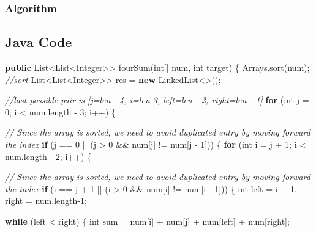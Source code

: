 \documentclass[]{book}
\newenvironment{Shaded}{\begin{snugshade}}{\end{snugshade}}
\newcommand{\BuiltInTok}[1]{#1}
\newcommand{\CommentTok}[1]{\textcolor[rgb]{0.56,0.35,0.01}{\textit{#1}}}
\newcommand{\DataTypeTok}[1]{\textcolor[rgb]{0.13,0.29,0.53}{#1}}
\newcommand{\DecValTok}[1]{\textcolor[rgb]{0.00,0.00,0.81}{#1}}
\newcommand{\FunctionTok}[1]{\textcolor[rgb]{0.00,0.00,0.00}{#1}}
\newcommand{\KeywordTok}[1]{\textcolor[rgb]{0.13,0.29,0.53}{\textbf{#1}}}
\newcommand{\NormalTok}[1]{#1}
\begin{document}
\hypertarget{algorithm-8}{%
\subsubsection{Algorithm}\label{algorithm-8}}

\hypertarget{java-code-6}{%
\subsection{Java Code}\label{java-code-6}}

\begin{Shaded}
\begin{Highlighting}[]
\KeywordTok{public} \BuiltInTok{List}\NormalTok{<}\BuiltInTok{List}\NormalTok{<}\BuiltInTok{Integer}\NormalTok{>> }\FunctionTok{fourSum}\NormalTok{(}\DataTypeTok{int}\NormalTok{[] num, }\DataTypeTok{int}\NormalTok{ target) \{}
    \BuiltInTok{Arrays}\NormalTok{.}\FunctionTok{sort}\NormalTok{(num); }\CommentTok{//sort}
    \BuiltInTok{List}\NormalTok{<}\BuiltInTok{List}\NormalTok{<}\BuiltInTok{Integer}\NormalTok{>> res = }\KeywordTok{new} \BuiltInTok{LinkedList}\NormalTok{<>();}

    \CommentTok{//last possible pair is [j=len - 4, i=len-3, left=len - 2, right=len - 1]}
    \KeywordTok{for}\NormalTok{ (}\DataTypeTok{int}\NormalTok{ j = }\DecValTok{0}\NormalTok{; i < num.}\FunctionTok{length}\NormalTok{ - }\DecValTok{3}\NormalTok{; i++) \{}

        \CommentTok{// Since the array is sorted, we need to avoid duplicated entry by moving forward the index}
        \KeywordTok{if}\NormalTok{ (j == }\DecValTok{0}\NormalTok{ || (j > }\DecValTok{0}\NormalTok{ && num[j] != num[j - }\DecValTok{1}\NormalTok{])) \{}
            \KeywordTok{for}\NormalTok{ (}\DataTypeTok{int}\NormalTok{ i = j + }\DecValTok{1}\NormalTok{; i < num.}\FunctionTok{length}\NormalTok{ - }\DecValTok{2}\NormalTok{; i++) \{}

                \CommentTok{// Since the array is sorted, we need to avoid duplicated entry by moving forward the index}
                \KeywordTok{if}\NormalTok{ (i == j + }\DecValTok{1}\NormalTok{ || (i > }\DecValTok{0}\NormalTok{ && num[i] != num[i - }\DecValTok{1}\NormalTok{])) \{}
                    \DataTypeTok{int}\NormalTok{ left = i + }\DecValTok{1}\NormalTok{, right = num.}\FunctionTok{length}\DecValTok{-1}\NormalTok{;}

                    \KeywordTok{while}\NormalTok{ (left < right) \{}
                        \DataTypeTok{int}\NormalTok{ sum = num[i] + num[j] + num[left] + num[right];}


\end{Highlighting}
\end{Shaded}
\end{document}

